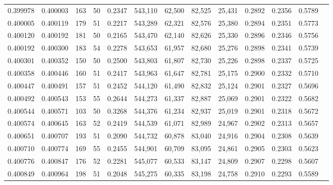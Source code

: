 \begin{tabular}{rrrrrrrrrrrrr}
0.399978 & 0.400003 &   163 &  50 &                                     0.2347 & 543,110 &  62,500 &  82,525 &  25,431 & 0.2892 & 0.2356 & 0.5789 \\
0.400005 & 0.400119 &   179 &  51 &                                     0.2217 & 543,289 &  62,321 &  82,576 &  25,380 & 0.2894 & 0.2351 & 0.5773 \\
0.400120 & 0.400192 &   181 &  50 &                                     0.2165 & 543,470 &  62,140 &  82,626 &  25,330 & 0.2896 & 0.2346 & 0.5756 \\
0.400192 & 0.400300 &   183 &  54 &                                     0.2278 & 543,653 &  61,957 &  82,680 &  25,276 & 0.2898 & 0.2341 & 0.5739 \\
0.400301 & 0.400352 &   150 &  50 &                                     0.2500 & 543,803 &  61,807 &  82,730 &  25,226 & 0.2898 & 0.2337 & 0.5725 \\
0.400358 & 0.400446 &   160 &  51 &                                     0.2417 & 543,963 &  61,647 &  82,781 &  25,175 & 0.2900 & 0.2332 & 0.5710 \\
0.400447 & 0.400491 &   157 &  51 &                                     0.2452 & 544,120 &  61,490 &  82,832 &  25,124 & 0.2901 & 0.2327 & 0.5696 \\
0.400492 & 0.400543 &   153 &  55 &                                     0.2644 & 544,273 &  61,337 &  82,887 &  25,069 & 0.2901 & 0.2322 & 0.5682 \\
0.400544 & 0.400571 &   103 &  50 &                                     0.3268 & 544,376 &  61,234 &  82,937 &  25,019 & 0.2901 & 0.2318 & 0.5672 \\
0.400574 & 0.400645 &   163 &  52 &                                     0.2419 & 544,539 &  61,071 &  82,989 &  24,967 & 0.2902 & 0.2313 & 0.5657 \\
0.400651 & 0.400707 &   193 &  51 &                                     0.2090 & 544,732 &  60,878 &  83,040 &  24,916 & 0.2904 & 0.2308 & 0.5639 \\
0.400710 & 0.400774 &   169 &  55 &                                     0.2455 & 544,901 &  60,709 &  83,095 &  24,861 & 0.2905 & 0.2303 & 0.5623 \\
0.400776 & 0.400847 &   176 &  52 &                                     0.2281 & 545,077 &  60,533 &  83,147 &  24,809 & 0.2907 & 0.2298 & 0.5607 \\
0.400849 & 0.400964 &   198 &  51 &                                     0.2048 & 545,275 &  60,335 &  83,198 &  24,758 & 0.2910 & 0.2293 & 0.5589 \\

\end{tabular}
